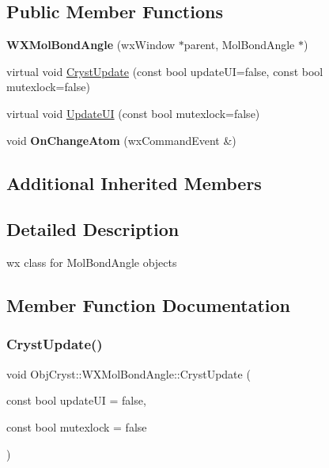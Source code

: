 \subsection*{Public Member Functions}
\begin{DoxyCompactItemize}
\item 
\mbox{\label{class_obj_cryst_1_1_w_x_mol_bond_angle_a68ea190cdd44105bee5c9d26ddb2c0a8}} 
{\bfseries W\+X\+Mol\+Bond\+Angle} (wx\+Window $\ast$parent, Mol\+Bond\+Angle $\ast$)
\item 
virtual void \mbox{\hyperlink{class_obj_cryst_1_1_w_x_mol_bond_angle_a5b2a6926b4fa8ec901eeaac25c954cc8}{Cryst\+Update}} (const bool update\+UI=false, const bool mutexlock=false)
\item 
virtual void \mbox{\hyperlink{class_obj_cryst_1_1_w_x_mol_bond_angle_ad9b0fd4485aaff2af3f32ddb1dd2b0f0}{Update\+UI}} (const bool mutexlock=false)
\item 
\mbox{\label{class_obj_cryst_1_1_w_x_mol_bond_angle_a141dd6f68b5cab06aae7c396b77bdfd9}} 
void {\bfseries On\+Change\+Atom} (wx\+Command\+Event \&)
\end{DoxyCompactItemize}
\subsection*{Additional Inherited Members}


\subsection{Detailed Description}
wx class for Mol\+Bond\+Angle objects 

\subsection{Member Function Documentation}
\mbox{\label{class_obj_cryst_1_1_w_x_mol_bond_angle_a5b2a6926b4fa8ec901eeaac25c954cc8}} 
\subsubsection{\texorpdfstring{CrystUpdate()}{CrystUpdate()}}
{\footnotesize\ttfamily void Obj\+Cryst\+::\+W\+X\+Mol\+Bond\+Angle\+::\+Cryst\+Update (\begin{DoxyParamCaption}\item[{const bool}]{update\+UI = {\ttfamily false},  }\item[{const bool}]{mutexlock = {\ttfamily false} }\end{DoxyParamCaption})\hspace{0.3cm}{\ttfamily [virtual]}}

